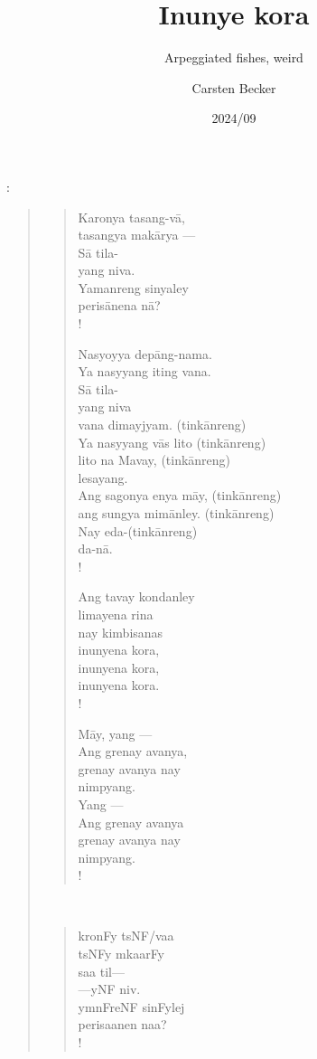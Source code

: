 \documentclass[12pt,paper=a4]{scrartcl}
\author{Carsten Becker}
\title{Inunye kora}
\subtitle{Arpeggiated fishes, weird}
\date{2024/09} %
\newenvironment{mytitle}{
	\hfill
	\begin{minipage}{0.667\textwidth}
	\vspace{\baselineskip}
	\begin{center}
		\Large
		\sffamily\bfseries
		\makeatletter
}{
		\makeatother
	\end{center}
	\vspace{1em}
	\end{minipage}
	\hfill
}
\begin{document}

\begin{mytitle}
	\@title: \@subtitle
\end{mytitle}

\begin{quote}
\begin{minipage}[t]{.5\linewidth}
\begin{verse}
\renewcommand*{\vrightskip}{-2em}
Karonya tasang-vā,\\
tasangya makārya ---\\
Sā tila-\\
yang niva.\\
Yamanreng sinyaley\\
perisānena nā?\\!

Nasyoyya depāng-nama.\\
Ya nasyyang iting vana.\\
Sā tila-\\
yang niva\\
vana dimayjyam. (tinkānreng)\\
Ya nasyyang vās lito (tinkānreng)\\
lito na Mavay, (tinkānreng)\\
lesayang.\\
Ang sagonya enya māy, (tinkānreng)\\
ang sungya mimānley. (tinkānreng)\\
Nay eda-(tinkānreng)\\
da-nā.\\!

Ang tavay kondanley\\
limayena rina\\
nay kimbisanas\\
inunyena kora,\\
inunyena kora,\\
inunyena kora.\\!

Māy, yang ---\\
Ang grenay avanya,\\
grenay avanya nay\\
nimpyang.\\
Yang ---\\
Ang grenay avanya\\
grenay avanya nay\\
nimpyang.\\!
\end{verse}
\end{minipage}
~
\begin{minipage}[t]{.5\linewidth}
\Tagati %
\begin{verse}
kronFy tsNF/vaa\\
tsNFy mkaarFy\\
saa til—\\
—yNF niv.\\
ymnFreNF sinFylej\\
perisaanen naa?\\!


\end{verse}
\end{minipage}
\end{quote}
\end{document}
